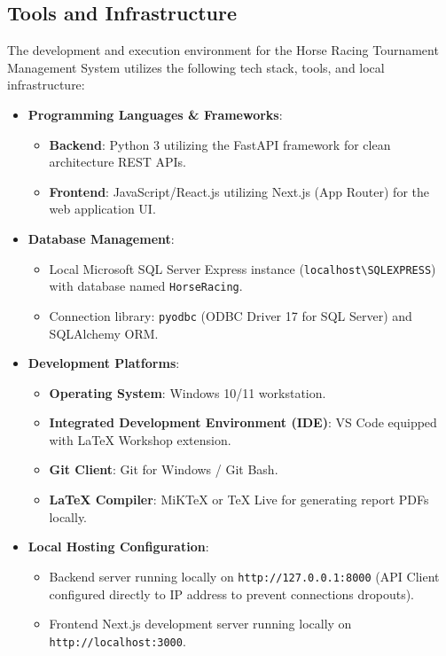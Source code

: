 \subsection{Tools and Infrastructure}

The development and execution environment for the Horse Racing Tournament Management System utilizes the following tech stack, tools, and local infrastructure:
\begin{itemize}
    \item \textbf{Programming Languages \& Frameworks}:
    \begin{itemize}
        \item \textbf{Backend}: Python 3 utilizing the FastAPI framework for clean architecture REST APIs.
        \item \textbf{Frontend}: JavaScript/React.js utilizing Next.js (App Router) for the web application UI.
    \end{itemize}
    \item \textbf{Database Management}: 
    \begin{itemize}
        \item Local Microsoft SQL Server Express instance (\texttt{localhost\textbackslash SQLEXPRESS}) with database named \texttt{HorseRacing}.
        \item Connection library: \texttt{pyodbc} (ODBC Driver 17 for SQL Server) and SQLAlchemy ORM.
    \end{itemize}
    \item \textbf{Development Platforms}:
    \begin{itemize}
        \item \textbf{Operating System}: Windows 10/11 workstation.
        \item \textbf{Integrated Development Environment (IDE)}: VS Code equipped with LaTeX Workshop extension.
        \item \textbf{Git Client}: Git for Windows / Git Bash.
        \item \textbf{LaTeX Compiler}: MiKTeX or TeX Live for generating report PDFs locally.
    \end{itemize}
    \item \textbf{Local Hosting Configuration}:
    \begin{itemize}
        \item Backend server running locally on \texttt{http://127.0.0.1:8000} (API Client configured directly to IP address to prevent connections dropouts).
        \item Frontend Next.js development server running locally on \texttt{http://localhost:3000}.
    \end{itemize}
\end{itemize}

